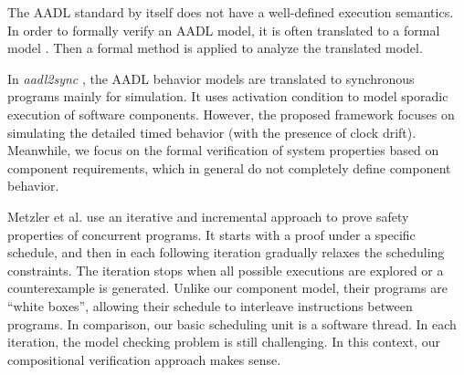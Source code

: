 The AADL standard by itself does not have a well-defined execution semantics. In order to formally verify an AADL model, it is often translated to a formal model \cite{AADL2TASM} \cite{AADL2Sync} \cite{AADL2TLA} \cite{AADS} \cite{AADL2BIP}. Then a formal method is applied to analyze the translated model.

In \emph{aadl2sync} \cite{AADL2Sync}, the AADL behavior models are translated to synchronous programs mainly for simulation. It uses activation condition to model sporadic execution of software components. However, the proposed framework focuses on simulating the detailed timed behavior (with the presence of clock drift). Meanwhile, we focus on the formal verification of system properties based on component requirements, which in general do not completely define component behavior.

Metzler et al. \cite{Metzler2020} use an iterative and incremental approach to prove safety properties of concurrent programs. It starts with a proof under a specific schedule, and then in each following iteration gradually relaxes the scheduling constraints. The iteration stops when all possible executions are explored or a counterexample is generated. Unlike our component model, their programs are ``white boxes'', allowing their schedule to interleave instructions between programs. In comparison, our basic scheduling unit is a software thread. In each iteration, the model checking problem is still challenging. In this context, our compositional verification approach makes sense.

